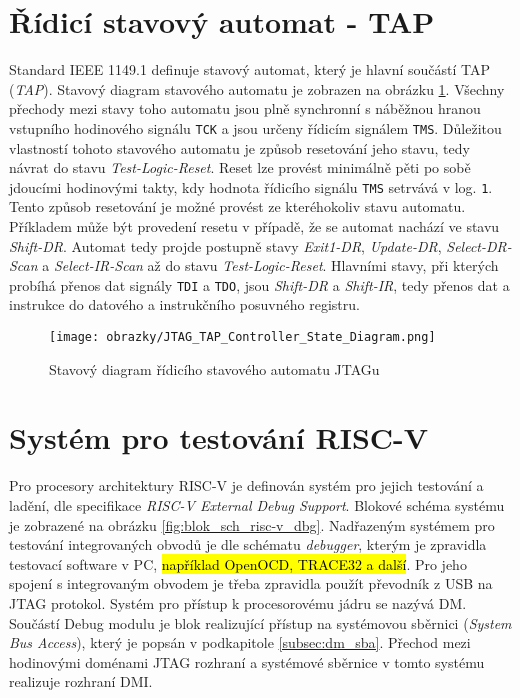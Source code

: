 \section{Řídicí stavový automat - \acs{TAP}}
Standard IEEE 1149.1 definuje stavový automat, který je hlavní součástí \acs{TAP} (\textit{\acl{TAP}}). Stavový diagram stavového automatu je zobrazen na obrázku \ref{fig:tap_controller}. Všechny přechody mezi stavy toho automatu jsou plně synchronní s náběžnou hranou vstupního hodinového signálu \texttt{\acs{TCK}} a jsou určeny řídicím signálem \texttt{\acs{TMS}}. Důležitou vlastností tohoto stavového automatu je způsob resetování jeho stavu, tedy návrat do stavu \textit{Test-Logic-Reset}. Reset lze provést minimálně pěti po sobě jdoucími hodinovými takty, kdy hodnota řídicího signálu \texttt{\acs{TMS}} setrvává v log. \texttt{1}. Tento způsob resetování je možné provést ze kteréhokoliv stavu automatu. Příkladem může být provedení resetu v případě, že se automat nachází ve stavu \textit{Shift-DR}. Automat tedy projde postupně stavy \textit{Exit1-DR}, \textit{Update-DR}, \textit{Select-DR-Scan} a \textit{Select-IR-Scan} až do stavu \textit{Test-Logic-Reset}. Hlavními stavy, při kterých probíhá přenos dat signály \texttt{\acs{TDI}} a \texttt{\acs{TDO}}, jsou \textit{Shift-DR} a \textit{Shift-IR}, tedy přenos dat a instrukce do datového a instrukčního posuvného registru. \cite {IEEE_1149-1}


\begin{figure}[H]
  \begin{center}
    \texttt{[image: obrazky/JTAG\_TAP\_Controller\_State\_Diagram.png]}
  \end{center}
  \caption{Stavový diagram řídicího stavového automatu JTAGu \cite{JTAG_TAP_diagram}}
	\label{fig:tap_controller}
\end{figure}

\section{Systém pro testování \acs{RISC-V}}		\label{sec:risc-v_dbg}
Pro procesory architektury \acs{RISC-V} je definován systém pro jejich testování a ladění, dle specifikace \textit{RISC-V External Debug Support}. Blokové schéma systému je zobrazené na obrázku \ref{fig:blok_sch_risc-v_dbg}. Nadřazeným systémem pro testování integrovaných obvodů je dle schématu \textit{debugger}, kterým je zpravidla testovací software v PC, \hl{například OpenOCD, TRACE32 a další}. Pro jeho spojení s integrovaným obvodem je třeba zpravidla použít převodník z USB na JTAG protokol. Systém pro přístup k procesorovému jádru se nazývá \ac{DM}. Součástí Debug modulu je blok realizující přístup na systémovou sběrnici (\textit{System Bus Access}), který je popsán v podkapitole \ref{subsec:dm_sba}. Přechod mezi hodinovými doménami \acs{JTAG} rozhraní a systémové sběrnice v tomto systému realizuje rozhraní \ac{DMI}. \cite{risc-v_dbg}

